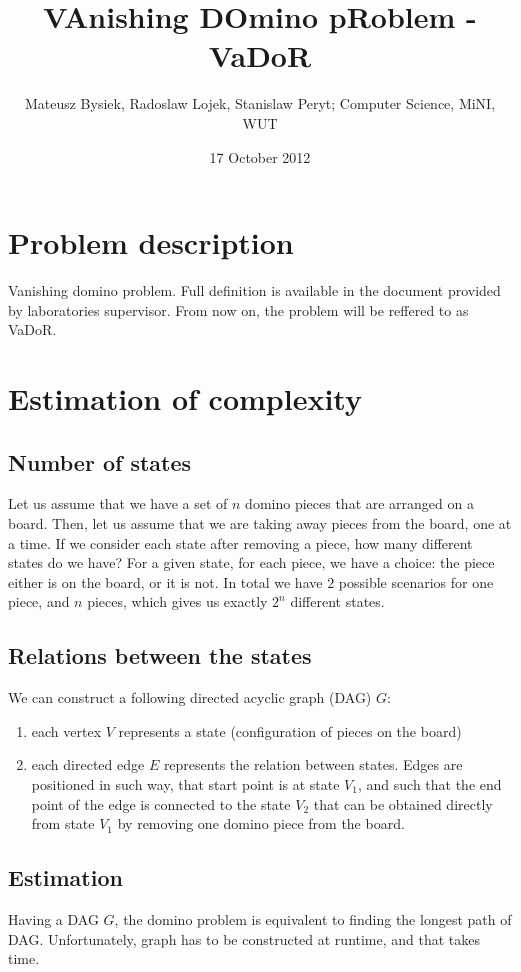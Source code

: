 \documentclass{article}
\begin{document}
\title{VAnishing DOmino pRoblem - VaDoR}
\author{Mateusz Bysiek, Radoslaw Lojek, Stanislaw Peryt; Computer Science, MiNI, WUT}
\date{17 October 2012}
\maketitle


\section{Problem description}
Vanishing domino problem. Full definition is available in the document provided by laboratories
supervisor. From now on, the problem will be reffered to as VaDoR.

\section{Estimation of complexity}
\subsection{Number of states}
Let us assume that we have a set of $n$ domino pieces that are arranged on a board. Then, 
let us assume that we are taking away pieces from the board, one at a time. If we consider each 
state after removing a piece, how many different states do we have? For a given state, for each piece, 
we have a choice: the piece either is on the board, or it is not. In total we have $2$ possible scenarios
for one piece, and $n$ pieces, which gives us exactly $2^n$ different states.

\subsection{Relations between the states}
We can construct a following directed acyclic graph (DAG) $G$:
\begin{enumerate}
  \item each vertex $V$ represents a state (configuration of pieces on the board)
  \item each directed edge $E$ represents the relation between states. Edges 
  are positioned in such way, that start point is at state $V_1$, and such that 
  the end point of the edge is connected to the state $V_2$ that can be obtained 
  directly from state $V_1$ by removing one domino piece from the board.
\end{enumerate}

\subsection{Estimation}
Having a DAG $G$, the domino problem is equivalent to finding the longest path of DAG. 
Unfortunately, graph has to be constructed at runtime, and that takes time. 
\end{document}
